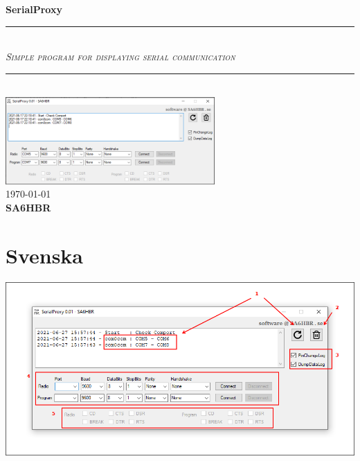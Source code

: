\documentclass[a4paper]{article}
\begin{document}
\begin{titlepage}
\vspace*{100px}
\newcommand{\HRule}{\rule{\linewidth}{0.5mm}} 	
\center 
 
{ \huge \bfseries SerialProxy}
\vspace*{50px}

\HRule \\[0.8cm]

\textsc{\normalsize \emph {Simple program for displaying serial communication}}\\[0.8cm]

\HRule \\[1cm]

\includegraphics[width=0.6\textwidth]{../image/SerialProxy.png}\\[3cm] 

{\large \today}\\[2cm]
\textsc{ \huge \bfseries SA6HBR}\\[1cm]

\vfill 
\end{titlepage}

\pagestyle{fancy}
\fancyhf{}
\lhead{\today}

\cfoot{ \thepage}



\section*{Svenska}

\includegraphics[width=1\textwidth]{../image/SerialProxyInfo.png}\\[1cm] 
\end{document}
